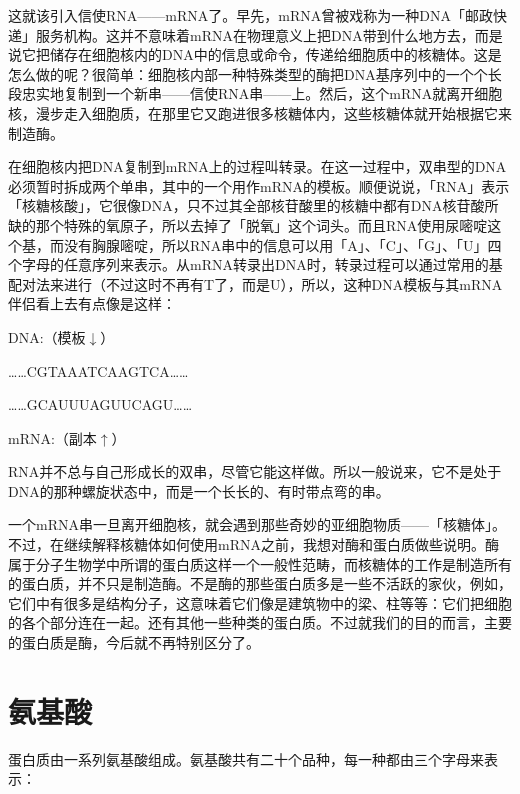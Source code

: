\documentclass[
  12pt,
  twoside,
  openright,
  oldfontcommands,
]{memoir}
\begin{document}
这就该引入信使RNA------mRNA了。早先，mRNA曾被戏称为一种DNA「邮政快递」服务机构。这并不意味着mRNA在物理意义上把DNA带到什么地方去，而是说它把储存在细胞核内的DNA中的信息或命令，传递给细胞质中的核糖体。这是怎么做的呢？很简单：细胞核内部一种特殊类型的酶把DNA基序列中的一个个长段忠实地复制到一个新串------信使RNA串------上。然后，这个mRNA就离开细胞核，漫步走入细胞质，在那里它又跑进很多核糖体内，这些核糖体就开始根据它来制造酶。

在细胞核内把DNA复制到mRNA上的过程叫转录。在这一过程中，双串型的DNA必须暂时拆成两个单串，其中的一个用作mRNA的模板。顺便说说，「RNA」表示「核糖核酸」，它很像DNA，只不过其全部核苷酸里的核糖中都有DNA核苷酸所缺的那个特殊的氧原子，所以去掉了「脱氧」这个词头。而且RNA使用尿嘧啶这个基，而没有胸腺嘧啶，所以RNA串中的信息可以用「A」、「C」、「G」、「U」四个字母的任意序列来表示。从mRNA转录出DNA时，转录过程可以通过常用的基配对法来进行（不过这时不再有T了，而是U），所以，这种DNA模板与其mRNA伴侣看上去有点像是这样：

DNA:（模板$\downarrow$）

\ldots\ldots CGTAAATCAAGTCA\ldots\ldots{}

\ldots\ldots GCAUUUAGUUCAGU\ldots\ldots{}

mRNA:（副本$\uparrow$）

RNA并不总与自己形成长的双串，尽管它能这样做。所以一般说来，它不是处于DNA的那种螺旋状态中，而是一个长长的、有时带点弯的串。

一个mRNA串一旦离开细胞核，就会遇到那些奇妙的亚细胞物质------「核糖体」。不过，在继续解释核糖体如何使用mRNA之前，我想对酶和蛋白质做些说明。酶属于分子生物学中所谓的蛋白质这样一个一般性范畴，而核糖体的工作是制造所有的蛋白质，并不只是制造酶。不是酶的那些蛋白质多是一些不活跃的家伙，例如，它们中有很多是结构分子，这意味着它们像是建筑物中的梁、柱等等：它们把细胞的各个部分连在一起。还有其他一些种类的蛋白质。不过就我们的目的而言，主要的蛋白质是酶，今后就不再特别区分了。

\section{氨基酸}

蛋白质由一系列氨基酸组成。氨基酸共有二十个品种，每一种都由三个字母来表示：
\end{document}
